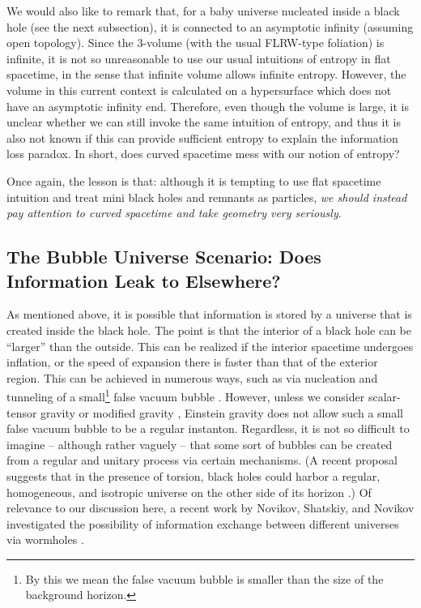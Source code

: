 \documentclass[12pt]{article}
\newcommand{\2}{$^2$}
\newcommand{\3}{$^3$}
\newcommand{\4}{$_4$}
\newcommand{\5}{$_5$}
\begin{document}
{\color{black}We would also like to remark that, for a baby universe nucleated inside a black hole (see the next subsection), it is connected to an asymptotic infinity (assuming open topology). Since the 3-volume (with the usual FLRW-type foliation) is infinite, it is not so unreasonable to use our usual intuitions of entropy in flat spacetime, in the sense that infinite volume allows infinite entropy. However, the volume in this current context is calculated on a hypersurface which does not have an asymptotic infinity end. Therefore, even though the volume is large, it is unclear whether we can still invoke the same intuition of entropy, and thus it is also not known if this can provide sufficient entropy to explain the information loss paradox. In short, does curved spacetime mess with our notion of entropy?}

Once again, the lesson is that:  although it is tempting to use flat spacetime intuition and treat mini black holes and remnants as particles, \emph{we should instead pay attention to curved spacetime and take geometry very seriously}.

\subsection{The Bubble Universe Scenario: Does Information Leak to Elsewhere?}

As mentioned above, it is possible that information is stored by a universe that is created inside the black hole. The point is that the interior of a black hole can be ``larger'' than the outside. This can be realized if the interior spacetime undergoes inflation, or the speed of expansion there is faster than that of  the exterior region. This can be achieved in numerous ways, such as via nucleation and tunneling of a small\footnote{By this we mean the false vacuum bubble is smaller than the size of the background horizon.} false vacuum bubble \cite{Blau:1986cw,Farhi:1989yr}. However, unless we consider scalar-tensor gravity or modified gravity \cite{Kim:2010yr}, Einstein gravity does not allow such a small false vacuum bubble to be a regular instanton. Regardless, it is not so difficult to imagine -- although rather vaguely -- that some sort of bubbles can be created from a regular and unitary process via certain mechanisms. (A recent proposal suggests that in the presence of torsion, black holes could harbor a regular, homogeneous, and isotropic universe on the other side of its horizon \cite{Poplawski}.) Of relevance to our discussion here, a recent work by Novikov, Shatskiy, and Novikov investigated the possibility of information exchange between different universes via wormholes \cite{NSN}.
\end{document}
